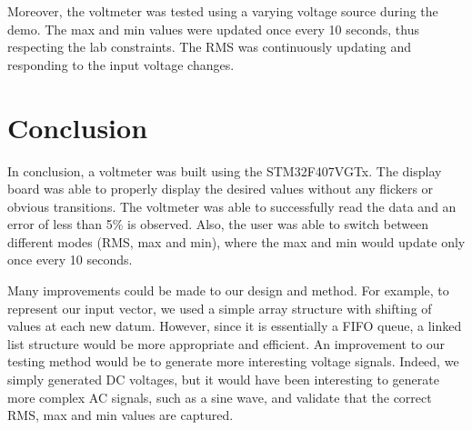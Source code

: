 \documentclass[a4paper,titlepage]{article}
\begin{document}
Moreover, the voltmeter was tested using a varying voltage source during the demo. The max and min values were updated once every 10 seconds, thus respecting the lab constraints. The RMS was continuously updating and responding to the input voltage changes.

\section{Conclusion}
In conclusion, a voltmeter was built using the STM32F407VGTx. The display board was able to properly display the desired values without any flickers or obvious transitions. The voltmeter was able to successfully read the data and an error of less than 5\% is observed. Also, the user was able to switch between different modes (RMS, max and min), where the max and min would update only once every 10 seconds.

Many improvements could be made to our design and method. For example, to represent our input vector, we used a simple array structure with shifting of values at each new datum. However, since it is essentially a FIFO queue, a linked list structure would be more appropriate and efficient. An improvement to our testing method would be to generate more interesting voltage signals. Indeed, we simply generated DC voltages, but it would have been interesting to generate more complex AC signals, such as a sine wave, and validate that the correct RMS, max and min values are captured.





\clearpage
\onecolumn
\appendix

{}

\end{document}
